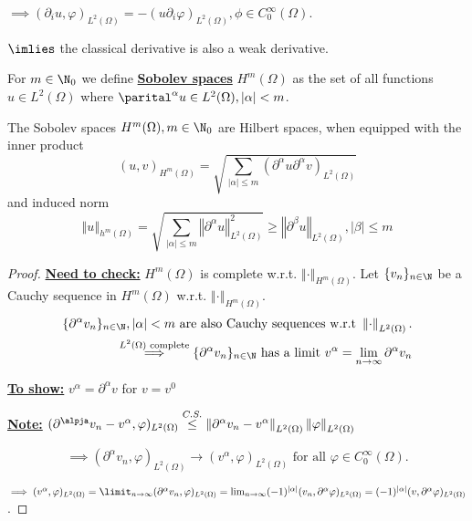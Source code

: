 $\implies (\partial_i u,\varphi)_{L^2(\Omega)}=-(u\partial_i \varphi)_{L^2(\Omega)},\phi\in C_0^\infty(\Omega)$.

$\imlies$ the classical derivative is also a weak derivative.

\begin{definition}
    For $m\in \N_0$ we define \underline{\textbf{Sobolev spaces}} $H^m(\Omega)$ as the set of all functions $u\in L^2(\Omega)$ where $\parital^\alpha u\in L^2(\Omega),|\alpha|<m$.
\end{definition}

\begin{theorem}
    The Sobolev spaces $H^m(\Omega),m\in\N_0$ are Hilbert spaces, when equipped with the inner product 
    \[(u,v)_{H^m(\Omega)}=\sqrt{\sum_{|\alpha|\leq m}(\partial^\alpha u \partial^\alpha v)_{L^2(\Omega)}}\]
    and induced norm 
    \[\left\Vert u \right\Vert_{h^m(\Omega)}=\sqrt{\sum_{|\alpha|\leq m}\left\Vert \partial^\alpha u \right\Vert^2_{L^2(\Omega)}}\geq \left\Vert \partial^\beta u \right\Vert_{L^2(\Omega)},|\beta|\leq m\]
\end{theorem}

\begin{proof}
\underline{\textbf{Need to check:}} $H^m(\Omega)$ is complete w.r.t. $\left\Vert \cdot \right\Vert_{H^m(\Omega)}$.
Let $\{v_n\}_{n\in \N}$ be a Cauchy sequence in $H^m(\Omega)$ w.r.t. $\left\Vert \cdot \right\Vert_{H^m(\Omega)}$.
\begin{align*}
    \{\partial^\alpha v_n\}_{n\in \N}, |\alpha|<m \text{ are also Cauchy sequences w.r.t } \left\Vert \cdot \right\Vert_{L^2(\Omega)}.\\
    \stackrel{L^2(\Omega)\text{ complete}}{\implies}\{\partial^\alpha v_n\}_{n\in\N}\text{ has a limit }v^\alpha = \lim_{n\to\infty}\partial^\alpha v_n
\end{align*}     

\underline{\textbf{To show:}} $v^\alpha=\partial^\alpha v$ for $v=v^0$

\underline{\textbf{Note:}} $(\partial^\alpja v_n-v^\alpha,\varphi)_{L^2(\Omega)}\stackrel{C.S.}{\leq} \left\Vert \partial^\alpha v_n-v^\alpha \right\Vert_{L^2(\Omega)} \left\Vert \varphi \right\Vert_{L^2(\Omega)}$

\[\implies (\partial^\alpha v_n,\varphi)_{L^2(\Omega)}\to (v^\alpha,\varphi)_{L^2(\Omega)}\text{ for all } \varphi\in C_0^\infty(\Omega).\]

$\implies (v^\alpha,\varphi)_{L^2(\Omega)}=\limit_{n\to\infty} (\partial^\alpha v_n,\varphi)_{L^2(\Omega)}=\lim_{n\to\infty}(-1)^{|\alpha|}(v_n,\partial^\alpha\varphi)_{L^2(\Omega)}=(-1)^{|\alpha|}(v,\partial^\alpha \varphi)_{L^2(\Omega)}$.

\end{proof}

